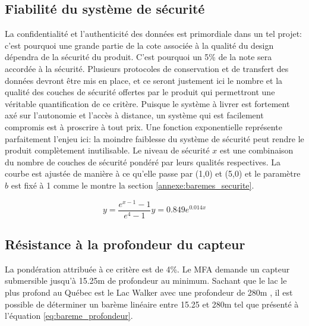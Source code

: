 \subsection{Fiabilité du système de sécurité}
\label{syssecu}


La confidentialité et l'authenticité des données est primordiale dans un tel projet: c'est pourquoi une grande partie de la cote associée à la qualité du design dépendra de la sécurité du produit. C'est pourquoi un 5\% de la note sera accordée à la sécurité. Plusieurs protocoles de conservation et de transfert des données devront être mis en place, et ce seront justement ici le nombre et la qualité des couches de sécurité offertes par le produit qui permettront une véritable quantification de ce critère. Puisque le système à livrer est fortement axé sur l'autonomie et l'accès à distance, un système qui est facilement compromis est à proscrire à tout prix. Une fonction exponentielle représente parfaitement l'enjeu ici: la moindre faiblesse du système de sécurité peut rendre le produit complètement inutilisable. Le niveau de sécurité $x$ est une combinaison du nombre de couches de sécurité pondéré par leurs qualités respectives. La courbe est ajustée de manière à ce qu'elle passe par (1,0) et (5,0) et le paramètre $b$ est fixé à 1 comme le montre la section \ref{annexe:baremes_securite}.

\begin{equation}
    y =\frac{e^{x-1}-1}{e^4-1}
    y = 0.849e^{0.014x}
    \label{eq:bareme_sécurité}
\end{equation}

\subsection{Résistance à la profondeur du capteur}
\label{Respro}

La pondération attribuée à ce critère est de 4\%. Le MFA demande un capteur submersible jusqu'à 15.25m de profondeur au minimum. Sachant que le lac le plus profond au Québec est le Lac Walker avec une profondeur de 280m \cite{Lac_walker}, il est possible de déterminer un barème linéaire entre 15.25 et 280m tel que présenté à l'équation \ref{eq:bareme_profondeur}.

